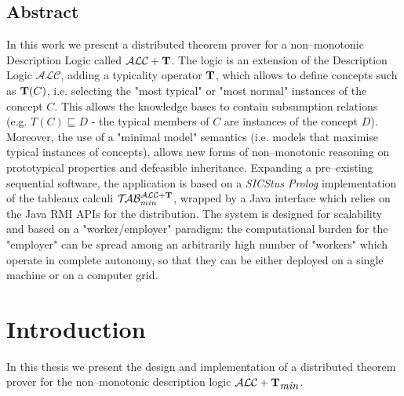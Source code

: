 \documentclass[a4paper, 11pt, oneside]{duthesis}
\newcommand{\tip}{{\bf T}}
\newcommand{\alc}{\mathcal{ALC}}
\newcommand{\alct}{\mathcal{ALC}+\tip}
\newcommand{\alctmin}{\mathcal{ALC}+\tip_{\mbox{\em min}}}
\newcommand{\nuovoc}{\mathrel{{\mathcal{T}\!\mathcal{AB}}}_{min}^{\mathcal{ALC}+\mbox{\scriptsize $\tip$}}}
\begin{document}

\section*{Abstract}

In this work we present a distributed theorem prover for a non--monotonic Description Logic called $\alct$.
The logic is an extension of the Description Logic $\alc$, adding a typicality operator $\tip$, which allows to define concepts such as $\tip(C)$, i.e. selecting the "most typical" or "most normal" instances of the concept $C$. This allows the knowledge bases to contain subsumption relations (e.g. $T(C) \sqsubseteq D$ - the typical members of $C$ are instances of the concept $D$). Moreover, the use of a "minimal model" semantics (i.e. models that maximise typical instances of concepts), allows new forms of non--monotonic reasoning on prototypical properties and defeasible inheritance.
Expanding a pre--existing sequential software, the application is based on a \emph{SICStus Prolog} implementation of the tableaux calculi $\nuovoc$, wrapped by a Java interface which relies on the Java RMI APIs for the distribution.
The system is designed for scalability and based on a "worker/employer" paradigm: the computational burden for the "employer" can be spread among an arbitrarily high number of "workers" which operate in complete autonomy, so that they can be either deployed on a single machine or on a computer grid.

\newpage


\tableofcontents

\newpage


\chapter{Introduction}

In this thesis we present the design and implementation of a distributed theorem prover for the non--monotonic description logic $\alctmin$.
\end{document}

